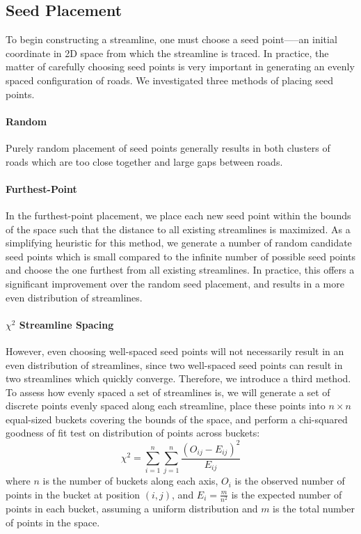 \documentclass[twocolumn]{article}
\begin{document}
\subsection{Seed Placement}\label{sec:seedpoints}
To begin constructing a streamline, one must choose a seed point—--an initial
coordinate in 2D space from which the streamline is traced. In practice, the
matter of carefully choosing seed points is very important in generating an
evenly spaced configuration of roads. We investigated three methods of placing
seed points.

\paragraph{Random}
Purely random placement of seed points generally results in both clusters of
roads which are too close together and large gaps between roads.

\paragraph{Furthest-Point}
In the furthest-point placement, we place each new seed point within the bounds
of the space such that the distance to all existing streamlines is maximized.
As a simplifying heuristic for this method, we generate a number of random
candidate seed points which is small compared to the infinite number of
possible seed points and choose the one furthest from all existing streamlines.
In practice, this offers a significant improvement over the random seed
placement, and results in a more even distribution of streamlines.

\paragraph{$\chi^2$ Streamline Spacing}
However, even choosing well-spaced seed points will not necessarily result in
an even distribution of streamlines, since two well-spaced seed points can
result in two streamlines which quickly converge. Therefore, we introduce a
third method. To assess how evenly spaced a set of streamlines is, we will
generate a set of discrete points evenly spaced along each streamline, place
these points into $n\times n$ equal-sized buckets covering the bounds of the
space, and perform a chi-squared goodness of fit test on distribution of points
across buckets:
\[
    \chi^2 = \sum_{i=1}^{n}\sum_{j=1}^n \frac{(O_{ij}-E_{ij})^2}{E_{ij}}
\]
where $n$ is the number of buckets along each axis, $O_i$ is the observed
number of points in the bucket at position $(i,j)$, and $E_i=\frac{m}{n^2}$ is
the expected number of points in each bucket, assuming a uniform distribution
and $m$ is the total number of points in the space.
\end{document}
